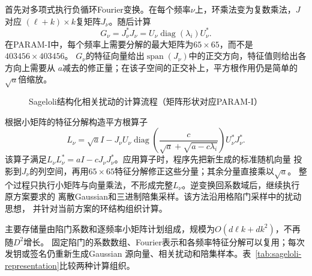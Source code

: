 首先对多项式执行负循环Fourier变换。在每个频率$\nu$上，环乘法变为复数乘法，$J$对应
$(\ell+k)\times k$复矩阵$J_\nu$。随后计算
\[
 G_\nu=J_\nu^*J_\nu
      =U_\nu\operatorname{diag}(\lambda_i)U_\nu^*.
\]
在PARAM-I中，每个频率上需要分解的最大矩阵为$65\times65$，而不是$403456\times403456$。
$G_\nu$的特征向量给出$\operatorname{span}(J_\nu)$中的正交方向，特征值则给出各方向上需要从
$a$减去的修正量；在该子空间的正交补上，平方根作用仍是简单的$\sqrt a$倍缩放。

\begin{figure}[H]
\centering
{}
\caption{Sageloli结构化相关扰动的计算流程（矩阵形状对应PARAM-I）}
\label{fig:ring-sampler}
\end{figure}

根据小矩阵的特征分解构造平方根算子
\[
 L_\nu=\sqrt a I-
 J_\nu U_\nu\operatorname{diag}\!\left(
 \frac{c}{\sqrt a+\sqrt{a-c\lambda_i}}
 \right)U_\nu^*J_\nu^*.
\]
该算子满足$L_\nu L_\nu^*=aI-cJ_\nu J_\nu^*$。应用算子时，程序先把新生成的标准随机向量
投影到$J_\nu$的列空间，再用$65\times65$特征分解修正这些分量；其余分量直接乘以$\sqrt a$。
整个过程只执行小矩阵与向量乘法，不形成完整$L_\nu$。逆变换回系数域后，继续执行原方案要求的
离散Gaussian和三进制陪集采样。该方法沿用格陷门采样中的扰动思想\cite{micciancio2012trapdoors}，
并针对当前方案的环结构组织计算。

主要存储量由陷门系数和逐频率小矩阵计划组成，规模为$O(d\ell k+dk^2)$，不再随$D^2$增长。
固定陷门的系数数组、Fourier表示和各频率特征分解可以复用；每次发钥或签名仍重新生成Gaussian
源向量、相关扰动和陪集样本。表~\ref{tab:sageloli-representation}比较两种计算组织。

